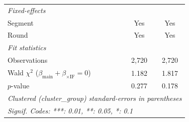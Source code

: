 \begin{tabular}{lcc}
   \midrule
   \emph{Fixed-effects}\\
   Segment                                                                    & Yes           & Yes\\  
   Round                                                                      & Yes           & Yes\\  
   \midrule
   \emph{Fit statistics}\\
   Observations                                                               & 2,720         & 2,720\\  
   Wald $\chi^2$ ($\beta_{\text{main}} + \beta_{\times \text{IF}} = 0$)       & 1.182         & 1.817\\  
   \quad $p$-value                                                            & 0.277         & 0.178\\  
   \midrule \midrule
   \multicolumn{3}{l}{\emph{Clustered (cluster\_group) standard-errors in parentheses}}\\
   \multicolumn{3}{l}{\emph{Signif. Codes: ***: 0.01, **: 0.05, *: 0.1}}\\
\end{tabular}
\par\endgroup


